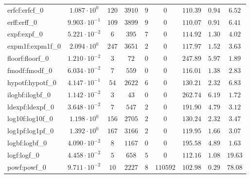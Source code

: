 \begin{tabular}{|l|c|c|c|c|c|c|c|c|}
erfcf:erfcf\_0               & $ 1.087 \cdot 10^{0}  $ & $ 120    $ & $ 3910   $ & $ 9   $ & $ 0      $ & $ 110.39      $ & $ 0.94    $ & $ 6.52    $ \\
erff:erff\_0                 & $ 9.903 \cdot 10^{-1} $ & $ 109    $ & $ 3899   $ & $ 9   $ & $ 0      $ & $ 110.07      $ & $ 0.91    $ & $ 6.41    $ \\
expf:expf\_0                 & $ 5.221 \cdot 10^{-2} $ & $ 6      $ & $ 395    $ & $ 7   $ & $ 0      $ & $ 114.92      $ & $ 1.30    $ & $ 4.02    $ \\
expm1f:expm1f\_0             & $ 2.094 \cdot 10^{0}  $ & $ 247    $ & $ 3651   $ & $ 2   $ & $ 0      $ & $ 117.97      $ & $ 1.52    $ & $ 3.63    $ \\
floorf:floorf\_0             & $ 1.210 \cdot 10^{-2} $ & $ 3      $ & $ 72     $ & $ 0   $ & $ 0      $ & $ 247.89      $ & $ 5.97    $ & $ 1.89    $ \\
fmodf:fmodf\_0               & $ 6.034 \cdot 10^{-2} $ & $ 7      $ & $ 559    $ & $ 0   $ & $ 0      $ & $ 116.01      $ & $ 1.38    $ & $ 2.83    $ \\
hypotf:hypotf\_0             & $ 4.147 \cdot 10^{-1} $ & $ 54     $ & $ 2622   $ & $ 6   $ & $ 0      $ & $ 130.21      $ & $ 2.32    $ & $ 6.83    $ \\
ilogbf:ilogbf\_0             & $ 1.142 \cdot 10^{-2} $ & $ 3      $ & $ 43     $ & $ 0   $ & $ 0      $ & $ 262.74      $ & $ 6.19    $ & $ 1.72    $ \\
ldexpf:ldexpf\_0             & $ 3.648 \cdot 10^{-2} $ & $ 7      $ & $ 547    $ & $ 2   $ & $ 0      $ & $ 191.90      $ & $ 4.79    $ & $ 3.12    $ \\
log10f:log10f\_0             & $ 1.198 \cdot 10^{0}  $ & $ 156    $ & $ 2705   $ & $ 2   $ & $ 0      $ & $ 130.24      $ & $ 2.32    $ & $ 3.47    $ \\
log1pf:log1pf\_0             & $ 1.392 \cdot 10^{0}  $ & $ 167    $ & $ 3166   $ & $ 2   $ & $ 0      $ & $ 119.95      $ & $ 1.66    $ & $ 3.07    $ \\
logbf:logbf\_0               & $ 4.090 \cdot 10^{-2} $ & $ 8      $ & $ 1167   $ & $ 0   $ & $ 0      $ & $ 195.58      $ & $ 4.89    $ & $ 1.63    $ \\
logf:logf\_0                 & $ 4.458 \cdot 10^{-2} $ & $ 5      $ & $ 658    $ & $ 5   $ & $ 0      $ & $ 112.16      $ & $ 1.08    $ & $ 19.63   $ \\
powf:powf\_0                 & $ 9.711 \cdot 10^{-2} $ & $ 10     $ & $ 2227   $ & $ 8   $ & $ 110592 $ & $ 102.98      $ & $ 0.29    $ & $ 78.08   $ \\

\end{tabular}
